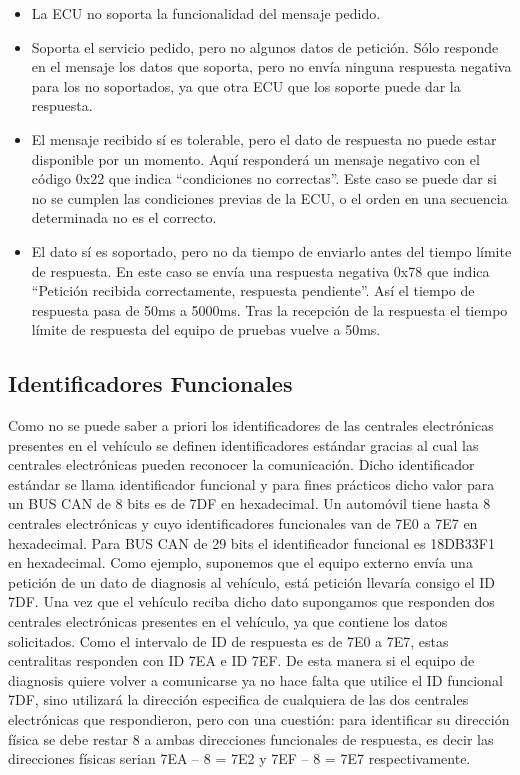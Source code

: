 \begin{itemize}
\item La ECU no soporta la funcionalidad del mensaje pedido.
\item Soporta el servicio pedido, pero no algunos datos de petición. Sólo responde en el mensaje los datos que soporta, pero no envía ninguna respuesta negativa para los no soportados, ya que otra ECU que los soporte puede dar la respuesta.
\item El mensaje recibido sí es tolerable, pero el dato de respuesta no puede estar disponible por un momento. Aquí responderá un mensaje negativo con el código 0x22 que indica “condiciones no correctas”. Este caso se puede dar si no se cumplen las condiciones previas de la ECU, o el orden en una secuencia determinada no es el correcto.
\item El dato sí es soportado, pero no da tiempo de enviarlo antes del tiempo límite de respuesta.  En este caso se envía una respuesta negativa 0x78 que indica “Petición recibida correctamente, respuesta pendiente”. Así el tiempo de respuesta pasa de 50ms a 5000ms. Tras la recepción de la respuesta el tiempo límite de respuesta del equipo de pruebas vuelve a 50ms.

\end{itemize}


\subsection {Identificadores Funcionales}
Como no se puede saber a priori los identificadores de las centrales electrónicas presentes en el vehículo se definen identificadores estándar gracias al cual las centrales electrónicas pueden reconocer la comunicación.  Dicho identificador estándar se llama identificador funcional y para fines prácticos dicho valor para un BUS CAN de 8 bits es de 7DF en hexadecimal. Un automóvil tiene hasta 8 centrales electrónicas y cuyo identificadores funcionales van de 7E0 a 7E7 en hexadecimal.  Para BUS CAN de 29 bits el identificador funcional es 18DB33F1 en hexadecimal. 
Como ejemplo, suponemos que el equipo externo envía una petición de un dato de diagnosis al vehículo, está petición llevaría consigo el ID 7DF. Una vez que el vehículo reciba dicho dato supongamos que responden dos centrales electrónicas presentes en el vehículo, ya que contiene los datos solicitados. Como el intervalo de ID de respuesta es de 7E0 a 7E7, estas centralitas responden con ID 7EA e ID 7EF. De esta manera si el equipo de diagnosis quiere volver a comunicarse ya no hace falta que utilice el ID funcional 7DF, sino utilizará la dirección especifica de cualquiera de las dos centrales electrónicas que respondieron, pero con una cuestión: para identificar su dirección física se debe restar 8 a ambas direcciones funcionales de respuesta, es decir las direcciones físicas serian 7EA – 8 = 7E2 y 7EF – 8 = 7E7 respectivamente.  

